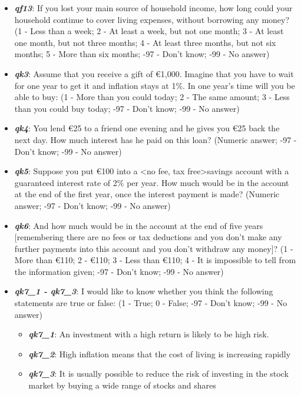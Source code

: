 \documentclass[a4paper,11pt]{article}
\begin{document}
\begin{itemize}
    \item \textit{\textbf{qf13}}: If you lost your main source of household income, how long could your household continue to cover living expenses, without borrowing any money? 
    (1 - Less than a week; 2 - At least a week, but not one month; 3 - At least one month, but not three months; 4 - At least three months, but not six months; 5 - More than six months; -97 - Don't know; -99 - No answer)

    \item \textit{\textbf{qk3}}: Assume that you receive a gift of \euro{}1,000. Imagine that you have to wait for one year to get it and inflation stays at 1\%. In one year’s time will you be able to buy:
    (1 - More than you could today; 2 - The same amount; 3 - Less than you could buy today; -97 - Don't know; -99 - No answer)

    \item \textit{\textbf{qk4}}: You lend \euro{}25 to a friend one evening and he gives you \euro{}25 back the next day. How much interest has he paid on this loan? 
    (Numeric answer; -97 - Don't know; -99 - No answer)

    \item \textit{\textbf{qk5}}: Suppose you put \euro{}100 into a \textless no fee, tax free\textgreater savings account with a guaranteed interest rate of 2\% per year. How much would be in the account at the end of the first year, once the interest payment is made? 
    (Numeric answer; -97 - Don't know; -99 - No answer)

    \item \textit{\textbf{qk6}}: And how much would be in the account at the end of five years [remembering there are no fees or tax deductions and you don’t make any further payments into this account and you don’t withdraw any money]? 
    (1 - More than \euro{}110; 2 - \euro{}110; 3 - Less than \euro{}110; 4 - It is impossible to tell from the information given; -97 - Don't know; -99 - No answer)

    \item \textit{\textbf{qk7\_1 - qk7\_3}}: I would like to know whether you think the following statements are true or false: (1 - True; 0 - False; -97 - Don't know; -99 - No answer)
    \begin{itemize}
        \item \textit{\textbf{qk7\_1}}: An investment with a high return is likely to be high risk. 
        \item \textit{\textbf{qk7\_2}}: High inflation means that the cost of living is increasing rapidly
        \item \textit{\textbf{qk7\_3}}: It is usually possible to reduce the risk of investing in the stock market by buying a wide range of stocks and shares
    \end{itemize}
\end{itemize}
\end{document}
